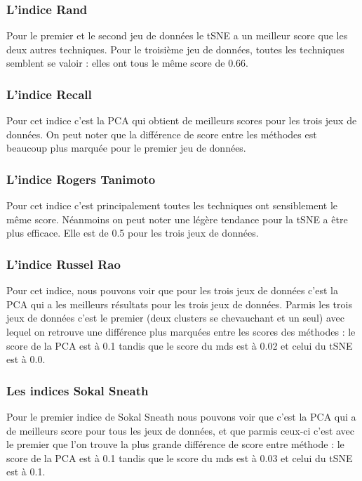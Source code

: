 \subsubsection{L'indice Rand}
Pour le premier et le second jeu de données le tSNE a un meilleur score que les deux autres techniques.
Pour le troisième jeu de données, toutes les techniques semblent se valoir : elles ont tous le même score de 0.66.


\subsubsection{L'indice Recall}
Pour cet indice c'est la PCA qui obtient de meilleurs scores pour les trois jeux de données.
On peut noter que la différence de score entre les méthodes est beaucoup plus marquée pour le premier jeu de données.


\subsubsection{L'indice Rogers Tanimoto}
Pour cet indice c'est principalement toutes les techniques ont sensiblement le même score. Néanmoins on peut noter une légère tendance 
pour la tSNE a être plus efficace. Elle est de 0.5 pour les trois jeux de données.

\subsubsection{L'indice Russel Rao}
Pour cet indice, nous pouvons voir que pour les trois jeux de données c'est la PCA qui a les meilleurs résultats pour les trois jeux de données.
Parmis les trois jeux de données c'est le premier (deux clusters se chevauchant et un seul) avec lequel on retrouve une différence plus marquées entre 
les scores des méthodes : le score de la PCA est à 0.1 tandis que le score du mds est à 0.02 et celui du tSNE est à 0.0.

\subsubsection{Les indices Sokal Sneath}

Pour le premier indice de Sokal Sneath nous pouvons voir que c'est la PCA qui a de meilleurs score pour tous les jeux de données, et que parmis ceux-ci
c'est avec le premier que l'on trouve la plus grande différence de score entre méthode : le score de la PCA est à 0.1 tandis que le score du mds est à 0.03 et celui du tSNE est à 0.1.

